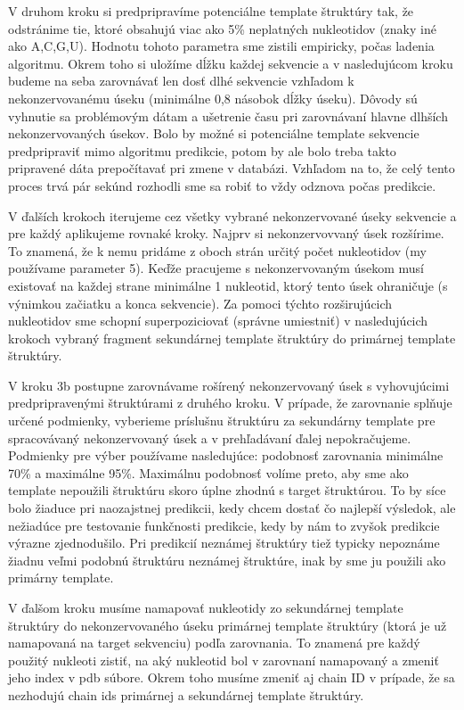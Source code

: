 \indent V druhom kroku si predpripravíme potenciálne template štruktúry tak, že odstránime tie, ktoré obsahujú viac ako 5\% neplatných nukleotidov (znaky iné ako A,C,G,U). Hodnotu tohoto parametra sme zistili empiricky, počas ladenia algoritmu. Okrem toho si uložíme dĺžku každej sekvencie a v nasledujúcom kroku budeme na seba zarovnávať len dosť dlhé sekvencie vzhľadom k nekonzervovanému úseku (minimálne 0,8 násobok dĺžky úseku). Dôvody sú vyhnutie sa problémovým dátam a ušetrenie času pri zarovnávaní hlavne dlhších nekonzervovaných úsekov. Bolo by možné si potenciálne template sekvencie predpripraviť mimo algoritmu predikcie, potom by ale bolo treba takto pripravené dáta prepočítavať pri zmene v databázi. Vzhľadom na to, že celý tento proces trvá pár sekúnd rozhodli sme sa robiť to vždy odznova počas predikcie.


\indent V ďalších krokoch iterujeme cez všetky vybrané nekonzervované úseky sekvencie a pre každý aplikujeme rovnaké kroky. Najprv si nekonzervovvaný úsek rozšírime. To znamená, že k nemu pridáme z oboch strán určitý počet nukleotidov (my používame parameter 5). Keďže pracujeme s nekonzervovaným úsekom musí existovať na každej strane minimálne 1 nukleotid, ktorý tento úsek ohraničuje (s výnimkou začiatku a konca sekvencie). Za pomoci týchto rozširujúcich nukleotidov sme schopní superpoziciovať (správne umiestniť) v nasledujúcich krokoch vybraný fragment sekundárnej template štruktúry do primárnej template štruktúry.


\indent V  kroku 3b postupne zarovnávame rošírený nekonzervovaný úsek s vyhovujúcimi predpripravenými štruktúrami z druhého kroku. V prípade, že zarovnanie splňuje určené podmienky, vyberieme príslušnu štruktúru za sekundárny template  pre spracovávaný nekonzervovaný úsek a v prehľadávaní ďalej nepokračujeme. Podmienky pre výber používame nasledujúce: podobnosť zarovnania minimálne 70\% a maximálne 95\%. Maximálnu podobnosť volíme preto, aby sme ako template nepoužili štruktúru skoro úplne zhodnú s target štruktúrou. To by síce bolo žiaduce pri naozajstnej predikcii, kedy chcem dostať čo najlepší výsledok, ale nežiadúce pre testovanie funkčnosti predikcie, kedy by nám to zvyšok predikcie výrazne zjednodušilo. Pri predikcií neznámej štruktúry tiež typicky nepoznáme žiadnu veľmi podobnú štruktúru neznámej štruktúre, inak by sme ju použili ako primárny template. 


\indent V ďalšom kroku musíme namapovať nukleotidy zo sekundárnej template štruktúry do nekonzervovaného úseku primárnej template štruktúry (ktorá je už namapovaná na target sekvenciu) podľa zarovnania. To znamená pre každý použitý nukleoti zistiť, na aký nukleotid bol v zarovnaní namapovaný a zmeniť jeho index v pdb súbore. Okrem toho musíme zmeniť aj chain ID v prípade, že sa nezhodujú chain ids primárnej a sekundárnej template štruktúry.


